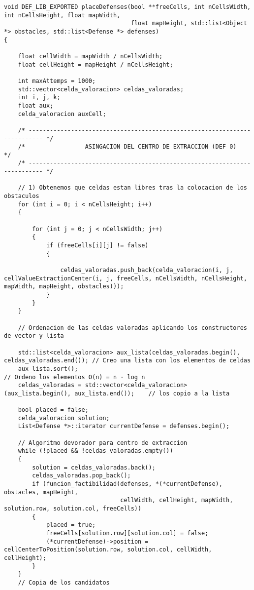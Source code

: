 \begin{lstlisting}
void DEF_LIB_EXPORTED placeDefenses(bool **freeCells, int nCellsWidth, int nCellsHeight, float mapWidth,
                                    float mapHeight, std::list<Object *> obstacles, std::list<Defense *> defenses)
{

    float cellWidth = mapWidth / nCellsWidth;
    float cellHeight = mapHeight / nCellsHeight;

    int maxAttemps = 1000;
    std::vector<celda_valoracion> celdas_valoradas;
    int i, j, k;
    float aux;
    celda_valoracion auxCell;

    /* -------------------------------------------------------------------------- */
    /*                 ASINGACION DEL CENTRO DE EXTRACCION (DEF 0)                */
    /* -------------------------------------------------------------------------- */

    // 1) Obtenemos que celdas estan libres tras la colocacion de los obstaculos
    for (int i = 0; i < nCellsHeight; i++)
    {

        for (int j = 0; j < nCellsWidth; j++)
        {
            if (freeCells[i][j] != false)
            {

                celdas_valoradas.push_back(celda_valoracion(i, j, cellValueExtractionCenter(i, j, freeCells, nCellsWidth, nCellsHeight, mapWidth, mapHeight, obstacles)));
            }
        }
    }

    // Ordenacion de las celdas valoradas aplicando los constructores de vector y lista

    std::list<celda_valoracion> aux_lista(celdas_valoradas.begin(), celdas_valoradas.end()); // Creo una lista con los elementos de celdas
    aux_lista.sort();                                                                        // Ordeno los elementos O(n) = n · log n
    celdas_valoradas = std::vector<celda_valoracion>(aux_lista.begin(), aux_lista.end());    // los copio a la lista

    bool placed = false;
    celda_valoracion solution;
    List<Defense *>::iterator currentDefense = defenses.begin();

    // Algoritmo devorador para centro de extraccion
    while (!placed && !celdas_valoradas.empty())
    {
        solution = celdas_valoradas.back();
        celdas_valoradas.pop_back();
        if (funcion_factibilidad(defenses, *(*currentDefense), obstacles, mapHeight,
                                 cellWidth, cellHeight, mapWidth, solution.row, solution.col, freeCells))
        {
            placed = true;
            freeCells[solution.row][solution.col] = false;
            (*currentDefense)->position = cellCenterToPosition(solution.row, solution.col, cellWidth, cellHeight);
        }
    }
    // Copia de los candidatos


\end{lstlisting}
